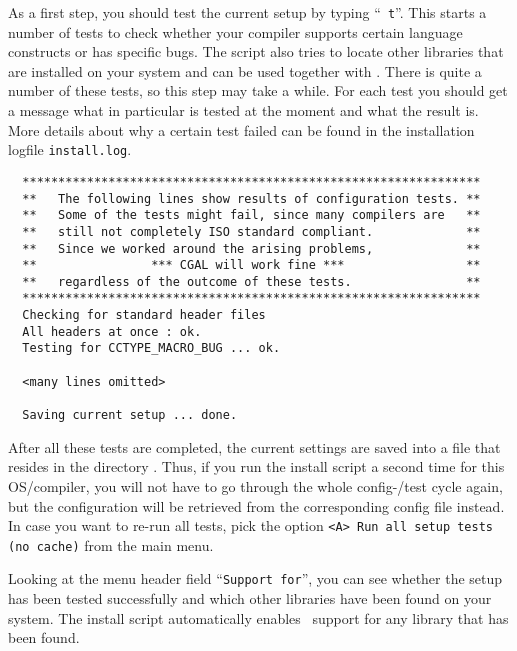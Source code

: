 As a first step, you should test the current setup by typing ``{\tt
  t}''. This starts a number of tests to check whether your compiler
supports certain language constructs or has specific bugs.  The script
also tries to locate other libraries that are installed on your system
and can be used together with \cgal. There is quite a number of these
tests, so this step may take a while.  For each test you should get a
message what in particular is tested at the moment and what the result
is. More details about why a certain test failed can be found in the
installation logfile \texttt{install.log}.

{\ccTexHtml{\scriptsize}{}
\begin{verbatim}
  ****************************************************************
  **   The following lines show results of configuration tests. **
  **   Some of the tests might fail, since many compilers are   **
  **   still not completely ISO standard compliant.             **
  **   Since we worked around the arising problems,             **
  **                *** CGAL will work fine ***                 **
  **   regardless of the outcome of these tests.                **
  ****************************************************************
  Checking for standard header files
  All headers at once : ok.
  Testing for CCTYPE_MACRO_BUG ... ok.

  <many lines omitted>

  Saving current setup ... done.
\end{verbatim}
}

After all these tests are completed, the current settings are saved
into a file that resides in the directory \cgalinstconfdir.  Thus, if
you run the install script a second time for this OS/compiler, you
will not have to go through the whole config-/test cycle again, but
the configuration will be retrieved from the corresponding config file
instead. In case you want to re-run all tests, pick the option
\texttt{<A> Run all setup tests (no cache)} from the main menu.

Looking at the menu header field ``\texttt{Support for}'', you can see
whether the setup has been tested successfully and which other
libraries have been found on your system. The install script
automatically enables \cgal\ support for any library that has been
found.

